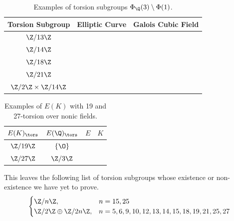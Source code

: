 \begin{frame}[plain]
	\begin{table}[!ht]
	\centering
	\caption{Examples of torsion subgroups $\Phi_\Q(3) \setminus \Phi(1)$.\label{tab:3qsm1}}
	\begin{tabular}{ccc} \hline
	Torsion Subgroup & Elliptic Curve & Galois Cubic Field \\ \hline
	$\Z/13\Z$ & \ofsbo{} & \qzetasp{} \\
	$\Z/14\Z$ & \fnat{} & \qzetasp{} \\
	$\Z/18\Z$ & \ofaf{} & \qzetasp{} \\
	$\Z/21\Z$ & \ostbo{} & \qzetanp{} \\
	$\Z/2\Z \times \Z/14\Z$ & \onttco{} & \ttnsoo{}
	\end{tabular}
	\end{table}

        \begin{table}[!ht]
        \centering
        \caption{Examples of $E(K)$ with 19 and 27-torsion over nonic fields.\label{tab:1927tor}}
        \begin{tabular}{cccc} \hline
        $E(K)_\tors$ & $E(\Q)_\tors$ &  $E$ & $K$ \\ \hline
        $\Z/19\Z$ & $\{ \O \}$ & \tsoao{} & \qzetantp{} \\ 
        $\Z/27\Z$ & $\Z/3\Z$ & \tsaf{} & \qzetatsp{}
        \end{tabular}
        \end{table}
\end{frame}





\begin{frame}[plain]
This leaves the following list of torsion subgroups whose existence or non-existence we have yet to prove. \pspace
	\[
	\begin{cases}
	\Z/n\Z, & n= 15, 25 \\
	\Z/2\Z \oplus \Z/2n\Z, & n= 5, 6, 9, 10, 12, 13, 14, 15, 18, 19, 21, 25, 27
	\end{cases}
	\]
\end{frame}





